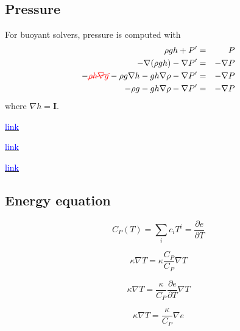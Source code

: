 \documentclass[a4paper, 12pt]{article}
\numberwithin{equation}{section}
\newcommand{\blue}[1]{\textcolor{blue}{#1}}
\newcommand{\red}[1]{\textcolor{red}{#1}}
\begin{document}
    \subsection{Pressure}

        For buoyant solvers, pressure is computed with
        \begin{eqnarray}
        \rho g h + P' &=& P \\
        - \nabla(\rho g h) - \nabla P' &=& - \nabla P \\
        - \red{\cancel{\rho h \nabla g}} - \rho g \nabla h - g h \nabla \rho - \nabla P' &=& - \nabla P \\
        - \rho g - g h \nabla \rho - \nabla P' &=& - \nabla P
        \end{eqnarray}
        where $\nabla h = \mathbf{I}$.

        \href{
        https://www.cfd-online.com/Forums/openfoam-solving/219609-rho-buoyant-solver-p-p\_rgh-ph\_rgh.html
        }{\blue{link}}

        \href{
        https://www.openfoam.com/documentation/guides/latest/api/prghTotalHydrostaticPressureFvPatchScalarField\_8H\_source.html
        }{\blue{link}}

        \href{
        https://www.openfoam.com/documentation/guides/latest/api/classFoam\_1\_1prghTotalHydrostaticPressureFvPatchScalarField.html
        }{\blue{link}}

    \subsection{Energy equation}

        \begin{equation}
        C_P (T) = \sum_i c_i T^i = \frac{\partial e}{\partial T}
        \end{equation}

        \begin{equation}
        \kappa \nabla T = \kappa \frac{C_P}{C_P} \nabla T
        \end{equation}

        \begin{equation}
        \kappa \nabla T = \frac{\kappa}{C_P} \frac{\partial e}{\partial T} \nabla T
        \end{equation}

        \begin{equation}
        \kappa \nabla T = \frac{\kappa}{C_P} \nabla e
        \end{equation}
\end{document}

